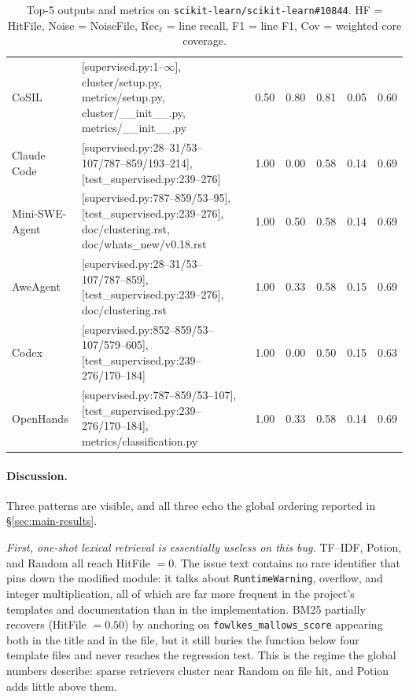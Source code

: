 \documentclass{llmxive}
\begin{document}
\begin{table}[!htbp]
\begin{tabular}{l p{6.6cm} ccccc}
CoSIL          & [supervised.py:1--$\infty$], cluster/setup.py, metrics/setup.py, cluster/\_\_init\_\_.py, metrics/\_\_init\_\_.py             & 0.50 & 0.80 & 0.81 & 0.05 & 0.60 \\
Claude Code    & [supervised.py:28--31/53--107/787--859/193--214], [test\_supervised.py:239--276]                                               & 1.00 & 0.00 & 0.58 & 0.14 & 0.69 \\
Mini-SWE-Agent & [supervised.py:787--859/53--95], [test\_supervised.py:239--276], doc/clustering.rst, doc/whats\_new/v0.18.rst                  & 1.00 & 0.50 & 0.58 & 0.14 & 0.69 \\
AweAgent       & [supervised.py:28--31/53--107/787--859], [test\_supervised.py:239--276], doc/clustering.rst                                    & 1.00 & 0.33 & 0.58 & 0.15 & 0.69 \\
Codex          & [supervised.py:852--859/53--107/579--605], [test\_supervised.py:239--276/170--184]                                             & 1.00 & 0.00 & 0.50 & 0.15 & 0.63 \\
OpenHands      & [supervised.py:787--859/53--107], [test\_supervised.py:239--276/170--184], metrics/classification.py                            & 1.00 & 0.33 & 0.58 & 0.14 & 0.69 \\
\bottomrule
\end{tabular}
\caption{Top-5 outputs and metrics on \texttt{scikit-learn/scikit-learn\#10844}.
HF = HitFile, Noise = NoiseFile, Rec$_\ell$ = line recall, F1 = line F1, Cov = weighted core coverage.}
\label{tab:case-sklearn}
\end{table}

\paragraph{Discussion.}
Three patterns are visible, and all three echo the global ordering reported in \S\ref{sec:main-results}.

\emph{First, one-shot lexical retrieval is essentially useless on this bug.}
TF--IDF, Potion, and Random all reach HitFile $=0$. The issue text contains no rare identifier that pins down the modified module: it talks about \texttt{RuntimeWarning}, overflow, and integer multiplication, all of which are far more frequent in the project's templates and documentation than in the implementation. BM25 partially recovers (HitFile $=0.50$) by anchoring on \texttt{fowlkes\_mallows\_score} appearing both in the title and in the file, but it still buries the function below four template files and never reaches the regression test. This is the regime the global numbers describe: sparse retrievers cluster near Random on file hit, and Potion adds little above them.
\end{document}

